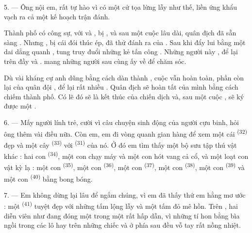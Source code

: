 5. --- Ông nội em, rất tự hào vì có một cử tọa lừng lẫy như thế, liền ứng khẩu vạch ra
cả một kế hoạch trận đánh.

Thành phố có công sự, với  và , bị 
, và sau một cuộc  lâu dài, quân địch đã sẵn sàng
. Nhưng , bị cái đói thúc ép, đã thử  đánh ra  của . Sau khi đẩy lui 
bằng một  dai dẳng quanh , 
tung  truy đuổi những kẻ tấn công . Những người này
, để lại trên  đầy  và
.  mang những người sau cùng ấy về
 để  chăm sóc.

Dù vài  kháng cự anh dũng bằng cách dàn thành , cuộc
 vẫn hoàn toàn, phần còn lại của quân đội , để lại rất
nhiều . Quân địch sẽ hoàn tất  của mình bằng cách
chiếm thành phố. Có lẽ đó sẽ là kết thúc của chiến dịch và, sau một cuộc , sẽ ký được một .

\VUsaut{4.4mm}
\VUsaut{2.8mm}

6. --- Mấy người lính trẻ, cười vì câu chuyện sinh động của người cựu binh, hỏi ông thêm
vài điều nữa. Còn em, em đi vòng quanh gian hàng để xem một cái 
\textsuperscript{(32)} đẹp và một cây  \textsuperscript{(33)} với
 \textsuperscript{(31)} của nó. Ở đó em tìm thấy một bộ sưu tập thú vật
khác : hai con  \textsuperscript{(34)}, một con  chạy máy
và một con  hót vang cả cổ, và một loạt con vật kỳ lạ : một con
 \textsuperscript{(35)}, một con  \textsuperscript{(36)}, một
con  \textsuperscript{(37)}, một con  \textsuperscript{(38)},
một con  \textsuperscript{(39)} và một con 
\textsuperscript{(40)} bằng bong bóng.

7. --- Em không dừng lại lâu để ngắm chúng, vì em đã thấy thứ em hằng mơ ước : một
 \textsuperscript{(41)} tuyệt đẹp với những tấm  lộng
lẫy và một tấm  đỏ mê hồn. Trên , hai diễn viên như đang
đóng một  trong một  rất hấp dẫn, vì những 
tí hon bằng bìa ngồi trong các lô hay trên những chiếc  và ở
 phía sau  đều vỗ tay rất nồng nhiệt.

